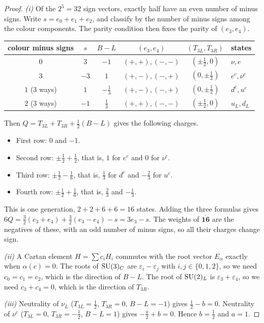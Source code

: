 \begin{proof}
\emph{(i)} Of the $2^5=32$ sign vectors, exactly half have an even number of minus signs. Write $s=e_0+e_1+e_2$, and classify by the number of minus signs among the colour components. The parity condition then fixes the parity of $(e_3,e_4)$.
\begin{center}
\begin{tabular}{cccccl}
colour minus signs & $s$ & $B-L$ & $(e_3,e_4)$ & $(T_{3L},T_{3R})$ & states\\\hline
$0$ & $3$ & $-1$ & $(+,+),(-,-)$ & $(\pm\frac12,0)$ & $\nu,e$\\
$3$ & $-3$ & $1$ & $(+,-),(-,+)$ & $(0,\pm\frac12)$ & $e^c,\nu^c$\\
$1$ (3 ways) & $1$ & $-\frac13$ & $(+,-),(-,+)$ & $(0,\pm\frac12)$ & $d^c,u^c$\\
$2$ (3 ways) & $-1$ & $\frac13$ & $(+,+),(-,-)$ & $(\pm\frac12,0)$ & $u_L,d_L$
\end{tabular}
\end{center}
Then $Q=T_{3L}+T_{3R}+\frac12(B-L)$ gives the following charges.
\begin{itemize}[nosep]
\item First row: $0$ and $-1$.
\item Second row: $\pm\frac12+\frac12$, that is, $1$ for $e^c$ and $0$ for $\nu^c$.
\item Third row: $\pm\frac12-\frac16$, that is, $\frac13$ for $d^c$ and $-\frac23$ for $u^c$.
\item Fourth row: $\pm\frac12+\frac16$, that is, $\frac23$ and $-\frac13$.
\end{itemize}
This is one generation, $2+2+6+6=16$ states. Adding the three formulas gives $6Q=\frac32(e_3+e_4)+\frac32(e_3-e_4)-s=3e_3-s$. The weights of $\overline{\mathbf{16}}$ are the negatives of these, with an odd number of minus signs, so all their charges change sign.

\emph{(ii)} A Cartan element $H=\sum c_iH_i$ commutes with the root vector $E_\alpha$ exactly when $\alpha(c)=0$. The roots of $\mathrm{SU}(3)_C$ are $\varepsilon_i-\varepsilon_j$ with $i,j\in\{0,1,2\}$, so we need $c_0=c_1=c_2$, which is the direction of $B-L$. The root of $\mathrm{SU}(2)_L$ is $\varepsilon_3+\varepsilon_4$, so we need $c_3+c_4=0$, which is the direction of $T_{3R}$.

\emph{(iii)} Neutrality of $\nu_L$ ($T_{3L}=\frac12$, $T_{3R}=0$, $B-L=-1$) gives $\frac12-b=0$. Neutrality of $\nu^c$ ($T_{3L}=0$, $T_{3R}=-\frac12$, $B-L=1$) gives $-\frac a2+b=0$. Hence $b=\frac12$ and $a=1$.


\end{proof}
